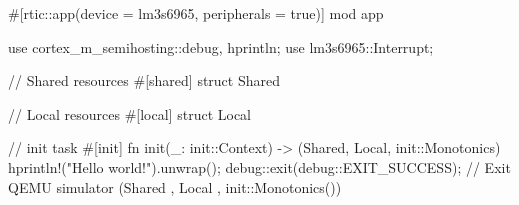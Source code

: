 #[rtic::app(device = lm3s6965, peripherals = true)]
mod app {
    use cortex_m_semihosting::{debug, hprintln};
    use lm3s6965::Interrupt;

    // Shared resources
    #[shared]
    struct Shared {}

    // Local resources
    #[local]
    struct Local {}

    // init task
    #[init]
    fn init(_: init::Context) -> (Shared, Local, init::Monotonics) {
        hprintln!("Hello world!").unwrap();
        debug::exit(debug::EXIT_SUCCESS); // Exit QEMU simulator
        (Shared {}, Local {}, init::Monotonics())
    }
}
